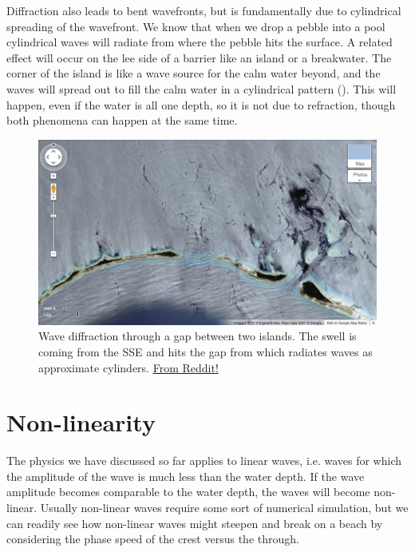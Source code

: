 Diffraction also leads to bent wavefronts, but is fundamentally due to cylindrical spreading of the wavefront.  We know that when we drop a pebble into a pool cylindrical waves will radiate from where the pebble hits the surface.  A related effect will occur on the lee side of a barrier like an island or a breakwater. The corner of the island is like a wave source for the calm water beyond, and the waves will spread out to fill the calm water in a cylindrical pattern ().  This will happen, even if the water is all one depth, so it is not due to refraction, though both phenomena can happen at the same time.    

\begin{figure}[hbt]
  \begin{center}
    \includegraphics{figs/Waves/WaveDiffraction}
    \caption{Wave diffraction through a gap between two islands.  The swell is coming from the SSE and hits the gap from which radiates waves as approximate cylinders. \href{https://www.reddit.com/r/Physics/comments/1c5vd1/messing_about_on_google_maps_and_i_found_a_giant/}{From Reddit!} }
    \label{fig:WaveDiffraction}  
  \end{center}
\end{figure}
 
 

\section{Non-linearity}

The physics we have discussed so far applies to linear waves, i.e. waves for which the amplitude of the wave is much less than the water depth. If the wave amplitude becomes comparable to the water depth, the waves will become non-linear.  Usually non-linear waves require some sort of numerical simulation, but we can readily see how non-linear waves might steepen and break on a beach by considering the phase speed of the crest versus the through.


